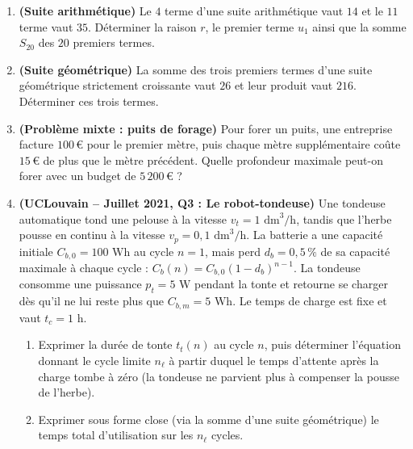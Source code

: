 \begin{enumerate}[label=\textbf{Exercice 6.\arabic* :}, leftmargin=*]
    \item \textbf{(Suite arithmétique)} Le $4$\ieme{} terme d'une suite arithmétique vaut $14$ et le $11$\ieme{} terme vaut $35$. Déterminer la raison $r$, le premier terme $u_1$ ainsi que la somme $S_{20}$ des $20$ premiers termes.
    \item \textbf{(Suite géométrique)} La somme des trois premiers termes d'une suite géométrique strictement croissante vaut $26$ et leur produit vaut $216$. Déterminer ces trois termes.
    \item \textbf{(Problème mixte : puits de forage)} Pour forer un puits, une entreprise facture $100$\,€ pour le premier mètre, puis chaque mètre supplémentaire coûte $15$\,€ de plus que le mètre précédent. Quelle profondeur maximale peut-on forer avec un budget de $5\,200$\,€ ?
    \item \textbf{(UCLouvain -- Juillet 2021, Q3 : Le robot-tondeuse)} Une tondeuse automatique tond une pelouse à la vitesse $v_t = 1\text{ dm}^3/\text{h}$, tandis que l'herbe pousse en continu à la vitesse $v_p = 0,1\text{ dm}^3/\text{h}$. La batterie a une capacité initiale $C_{b,0} = 100\text{ Wh}$ au cycle $n = 1$, mais perd $d_b = 0,5\,\%$ de sa capacité maximale à chaque cycle : $C_b(n) = C_{b,0}(1 - d_b)^{n-1}$. La tondeuse consomme une puissance $p_t = 5\text{ W}$ pendant la tonte et retourne se charger dès qu'il ne lui reste plus que $C_{b,m} = 5\text{ Wh}$. Le temps de charge est fixe et vaut $t_c = 1\text{ h}$.
    \begin{enumerate}[label=(\alph*)]
        \item Exprimer la durée de tonte $t_t(n)$ au cycle $n$, puis déterminer l'équation donnant le cycle limite $n_\ell$ à partir duquel le temps d'attente après la charge tombe à zéro (la tondeuse ne parvient plus à compenser la pousse de l'herbe).
        \item Exprimer sous forme close (via la somme d'une suite géométrique) le temps total d'utilisation sur les $n_\ell$ cycles.
    \end{enumerate}
\end{enumerate}
